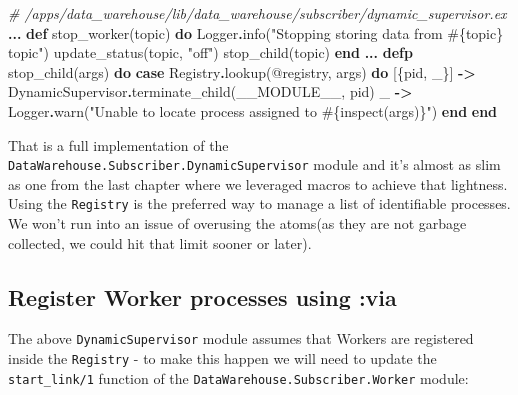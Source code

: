 \documentclass[
]{book}
\newenvironment{Shaded}{\begin{snugshade}}{\end{snugshade}}
\newcommand{\CommentTok}[1]{\textcolor[rgb]{0.56,0.35,0.01}{\textit{#1}}}
\newcommand{\ConstantTok}[1]{\textcolor[rgb]{0.00,0.00,0.00}{#1}}
\newcommand{\KeywordTok}[1]{\textcolor[rgb]{0.13,0.29,0.53}{\textbf{#1}}}
\newcommand{\NormalTok}[1]{#1}
\newcommand{\OperatorTok}[1]{\textcolor[rgb]{0.81,0.36,0.00}{\textbf{#1}}}
\newcommand{\OtherTok}[1]{\textcolor[rgb]{0.56,0.35,0.01}{#1}}
\newcommand{\StringTok}[1]{\textcolor[rgb]{0.31,0.60,0.02}{#1}}
\begin{document}
\begin{Shaded}
\begin{Highlighting}[]
  \CommentTok{\# /apps/data\_warehouse/lib/data\_warehouse/subscriber/dynamic\_supervisor.ex}
  \OperatorTok{...}
  \KeywordTok{def}\NormalTok{ stop\_worker(topic) }\KeywordTok{do}
    \ConstantTok{Logger}\OperatorTok{.}\NormalTok{info(}\StringTok{"Stopping storing data from }\OtherTok{\#\{}\NormalTok{topic}\OtherTok{\}}\StringTok{ topic"}\NormalTok{)}
\NormalTok{    update\_status(topic, }\StringTok{"off"}\NormalTok{)}
\NormalTok{    stop\_child(topic)}
  \KeywordTok{end}
  \OperatorTok{...}
  \KeywordTok{defp}\NormalTok{ stop\_child(args) }\KeywordTok{do}
    \KeywordTok{case} \ConstantTok{Registry}\OperatorTok{.}\NormalTok{lookup(}\OtherTok{@registry}\NormalTok{, args) }\KeywordTok{do}
\NormalTok{      [\{pid, \_\}] }\OperatorTok{{-}\textgreater{}} \ConstantTok{DynamicSupervisor}\OperatorTok{.}\NormalTok{terminate\_child(}\ConstantTok{\_\_MODULE\_\_}\NormalTok{, pid)}
\NormalTok{      \_ }\OperatorTok{{-}\textgreater{}} \ConstantTok{Logger}\OperatorTok{.}\NormalTok{warn(}\StringTok{"Unable to locate process assigned to }\OtherTok{\#\{}\NormalTok{inspect(args)}\OtherTok{\}}\StringTok{"}\NormalTok{)}
    \KeywordTok{end}
  \KeywordTok{end}
\end{Highlighting}
\end{Shaded}

That is a full implementation of the \texttt{DataWarehouse.Subscriber.DynamicSupervisor} module and it's almost as slim as one from the last chapter where we leveraged macros to achieve that lightness. Using the \texttt{Registry} is the preferred way to manage a list of identifiable processes. We won't run into an issue of overusing the atoms(as they are not garbage collected, we could hit that limit sooner or later).

\hypertarget{register-worker-processes-using-via}{%
\subsection{Register Worker processes using :via}\label{register-worker-processes-using-via}}

The above \texttt{DynamicSupervisor} module assumes that Workers are registered inside the \texttt{Registry} - to make this happen we will need to update the \texttt{start\_link/1} function of the \texttt{DataWarehouse.Subscriber.Worker} module:
\end{document}
